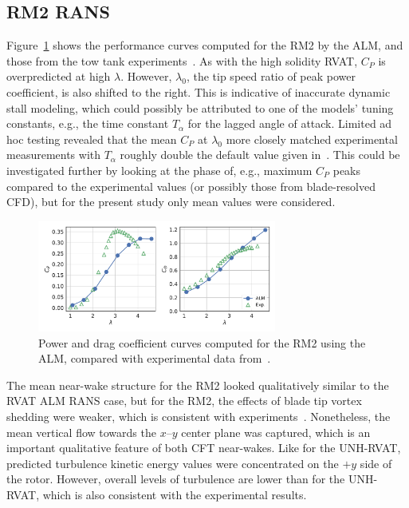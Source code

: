 \documentclass[times]{weauth}
\begin{document}
\subsection{RM2 RANS}

Figure~\ref{fig:RM2-ALM-perf-curves} shows the performance curves computed for
the RM2 by the ALM, and those from the tow tank
experiments~\cite{Bachant2016-RM2-paper}. As with the high solidity RVAT, $C_P$
is overpredicted at high $\lambda$. However, $\lambda_0$, the tip speed ratio of
peak power coefficient, is also shifted to the right. This is indicative of
inaccurate dynamic stall modeling, which could possibly be attributed to one of
the models' tuning constants, e.g., the time constant $T_\alpha$ for the lagged
angle of attack. Limited ad hoc testing revealed that the mean $C_P$ at
$\lambda_0$ more closely matched experimental measurements with $T_\alpha$
roughly double the default value given in~\cite{Sheng2008}. This could be
investigated further by looking at the phase of, e.g., maximum $C_P$ peaks
compared to the experimental values (or possibly those from blade-resolved CFD),
but for the present study only mean values were considered.


\begin{figure}
    \centering

    \includegraphics[width=0.7\textwidth]{RM2-ALM_perf-curves}

    \caption{Power and drag coefficient curves computed for the RM2 using the
        ALM, compared with experimental data from~\cite{Bachant2016-RM2-data}.}

    \label{fig:RM2-ALM-perf-curves}
\end{figure}

The mean near-wake structure for the RM2 looked qualitatively similar to the
RVAT ALM RANS case, but for the RM2, the effects of blade tip vortex shedding
were weaker, which is consistent with experiments~\cite{Bachant2016-RM2-paper}.
Nonetheless, the mean vertical flow towards the $x$--$y$ center plane was
captured, which is an important qualitative feature of both CFT near-wakes.
Like for the UNH-RVAT, predicted turbulence kinetic energy values were
concentrated on the $+y$ side of the rotor. However, overall levels of
turbulence are lower than for the UNH-RVAT, which is also consistent with the
experimental results.
\end{document}
